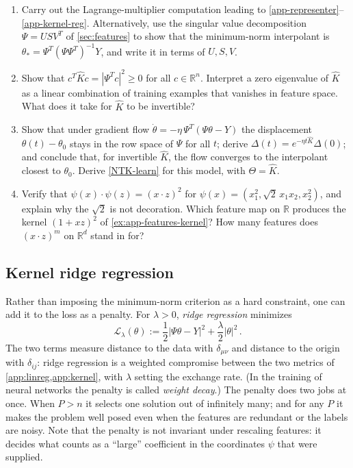 \documentclass[11pt]{article}
\newcommand{\R}{\mathbb{R}}
\newcommand{\CL}{{\mathcal L}}
\begin{document}
\begin{exercise}
\label{ex:app-kernel}
\begin{enumerate}
  \item Carry out the Lagrange-multiplier computation leading to \eqref{app-representer}--\eqref{app-kernel-reg}. Alternatively, use the singular value decomposition $\Psi = USV^T$ of \cref{sec:features} to show that the minimum-norm interpolant is $\theta_* = \Psi^T(\Psi\Psi^T)^{-1}Y$, and write it in terms of $U,S,V$.
  \item Show that $c^T\hat Kc = |\Psi^Tc|^2\geq 0$ for all $c\in\R^n$. Interpret a zero eigenvalue of $\hat K$ as a linear combination of training examples that vanishes in feature space. What does it take for $\hat K$ to be invertible?
  \item\label{ex:app-kernel-flow} Show that under gradient flow $\dot\theta = -\eta\,\Psi^T(\Psi\theta - Y)$ the displacement $\theta(t)-\theta_0$ stays in the row space of $\Psi$ for all $t$; derive $\Delta(t) = e^{-\eta t\hat K}\Delta(0)$; and conclude that, for invertible $\hat K$, the flow converges to the interpolant closest to $\theta_0$. Derive \eqref{NTK-learn} for this model, with $\Theta = \hat K$.
  \item Verify that $\psi(x)\cdot\psi(z) = (x\cdot z)^2$ for $\psi(x) = (x_1^2,\sqrt2\,x_1x_2,x_2^2)$, and explain why the $\sqrt2$ is not decoration. Which feature map on $\R$ produces the kernel $(1+xz)^2$ of \cref{ex:app-features-kernel}? How many features does $(x\cdot z)^m$ on $\R^d$ stand in for?
\end{enumerate}
\end{exercise}

\subsection{Kernel ridge regression}
\label{app:ridge}

Rather than imposing the minimum-norm criterion as a hard constraint, one can add it to the loss as a penalty. For $\lambda>0$, \emph{ridge regression} minimizes
%
\begin{equation}
    \CL_\lambda(\theta) := \frac{1}{2}|\Psi\theta - Y|^2 + \frac{\lambda}{2}|\theta|^2\,. \label{app-ridge-loss}
\end{equation}
%
The two terms measure distance to the data with $\delta_{\mu\nu}$ and distance to the origin with $\delta_{ij}$: ridge regression is a weighted compromise between the two metrics of \cref{app:linreg,app:kernel}, with $\lambda$ setting the exchange rate. (In the training of neural networks the penalty is called \emph{weight decay}.) The penalty does two jobs at once. When $P>n$ it selects one solution out of infinitely many; and for any $P$ it makes the problem well posed even when the features are redundant or the labels are noisy. Note that the penalty is not invariant under rescaling features: it decides what counts as a ``large'' coefficient in the coordinates $\psi$ that were supplied.
\end{document}
